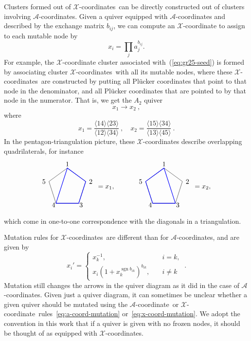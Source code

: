 \documentclass[11pt]{article}
\DeclareMathOperator{\sgn}{sgn}
\def\ket#1{\langle #1 \rangle}
\def\x{\mathcal{X}}
\def\xcoord{$\mathcal{X}$-coordinate}
\def\xcoords{$\mathcal{X}$-coordinates}
\def\a{\mathcal{A}}
\def\acoord{$\mathcal{A}$-coordinate}
\def\acoords{$\mathcal{A}$-coordinates}
\def\drawLabeledPentagon{
\coordinate (P1) at (90:1);
\coordinate (P2) at (18:1);
\coordinate (P3) at (306:1);
\coordinate (P4) at (234:1);
\coordinate (P5) at (162:1);
\draw (P1) -- (P2) -- (P3) -- (P4) -- (P5) -- cycle;
\draw (0,1.2) node {1};
\draw (1,.3) node[anchor=west] {2};
\draw (.5,-.9) node[anchor=west] {3};
\draw (-.5,-.9) node[anchor=east] {4};
\draw (-1,.3) node[anchor=east] {5};
}
\begin{document}
Clusters formed out of \xcoords\ can be directly constructed out of clusters involving \acoords. Given a quiver equipped with $\a$-coordinates and described by the exchange matrix $b_{ij}$, we can compute an $\x$-coordinate to assign to each mutable node by
\begin{equation} \label{eq:x_from_a_coordinates}
	x_i = \prod_j a_j^{b_{ij}}. 	
\end{equation} 
For example, the $\x$-coordinate cluster associated with~(\ref{eq:gr25-seed}) is formed by associating cluster \xcoords\ with all its mutable nodes, where these \xcoords\ are constructed by putting all Pl\"ucker coordinates that point to that node in the denominator, and all Pl\"ucker coordinates that are pointed to by that node in the numerator. That is, we get the $A_2$ quiver
\begin{equation} \label{eq:a2_x_seed}
	x_1 \to x_2\ ,
\end{equation}
where
\begin{equation}\label{def:xcoordsA2}
	x_1 = \frac{\ket{14}\ket{23}}{\ket{12}\ket{34}} \ , \quad x_2 = \frac{\ket{15}\ket{34}}{\ket{13}\ket{45}} \ .
\end{equation}
In the pentagon-triangulation picture, these $\x$-coordinates describe overlapping quadrilaterals, for instance
\begin{equation}
\begin{gathered}
\begin{tikzpicture}
  \drawLabeledPentagon
  \draw[color=blue, thick] (P1) -- (P2) -- (P3) -- (P4) -- cycle;
  \draw (2,0) node {$=x_1,$};
\begin{scope}[xshift = 5cm]
  \drawLabeledPentagon
  \draw[color=blue, thick] (P1) -- (P3) -- (P4) -- (P5) -- cycle;
  \draw (2,0) node {$=x_2,$};
\end{scope}
\end{tikzpicture} 
\end{gathered}
\end{equation}
which come in one-to-one correspondence with the diagonals in a triangulation.

Mutation rules for \xcoords\ are different than for \acoords, and are given by
\begin{equation}
  \label{eq:x-coord-mutation}
  x_{i}' =
  \begin{cases}
    x_{k}^{-1}, &\quad i=k,\\
    x_{i} (1+x_{k}^{\sgn b_{i k}})^{b_{i k}}, &\quad i \neq k
  \end{cases}\ .
\end{equation}
Mutation still changes the arrows in the quiver diagram as it did in the case of \acoords.  Given just a quiver diagram, it can sometimes be unclear whether a given quiver should be mutated using the \acoord\ or \xcoord\ rules~\eqref{eq:a-coord-mutation} or~\eqref{eq:x-coord-mutation}. We adopt the convention in this work that if a quiver is given with no frozen nodes, it should be thought of as equipped with \xcoords.
\end{document}
